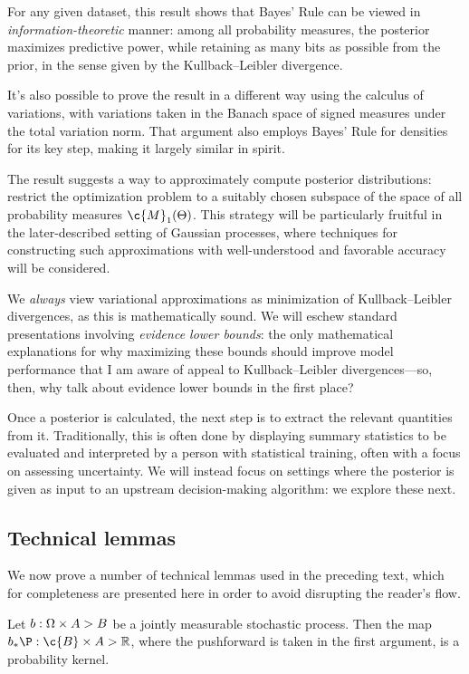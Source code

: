 \documentclass[11pt]{book}
\begin{document}
For any given dataset, this result shows that  Bayes' Rule can be viewed in \emph{information-theoretic} manner: among all probability measures, the posterior maximizes predictive power, while retaining as many bits as possible from the prior, in the sense given by the Kullback--Leibler divergence.

It's also possible to prove the result in a different way using the calculus of variations, with variations taken in the Banach space of signed measures under the total variation norm.
That argument also employs Bayes' Rule for densities for its key step, making it largely similar in spirit.

The result suggests a way to approximately compute posterior distributions: restrict the optimization problem to a suitably chosen subspace of the space of all probability measures $\c{M}_1(\Theta)$.
This strategy will be particularly fruitful in the later-described setting of Gaussian processes, where techniques for constructing such approximations with well-understood and favorable accuracy will be considered.

We \emph{always} view variational approximations as minimization of Kullback--Leibler divergences, as this is mathematically sound.
We will eschew standard presentations involving \emph{evidence lower bounds}: the only mathematical explanations for why maximizing these bounds should improve model performance that I am aware of appeal to Kullback--Leibler divergences---so, then, why talk about evidence lower bounds in the first place?

Once a posterior is calculated, the next step is to extract the relevant quantities from it.
Traditionally, this is often done by displaying summary statistics to be evaluated and interpreted by a person with statistical training, often with a focus on assessing uncertainty.
We will instead focus on settings where the posterior is given as input to an upstream decision-making algorithm: we explore these next.

\subsection{Technical lemmas}

We now prove a number of technical lemmas used in the preceding text, which for completeness are presented here in order to avoid disrupting the reader's flow.

\begin{lemma}
\label{lem:rcrv-rvm-equiv}
Let $b:\Omega\times A\->B$ be a jointly measurable stochastic process.
Then the map $b_*\P : \c{B} \x A \-> \R$, where the pushforward is taken in the first argument, is a probability kernel.
\end{lemma}
\end{document}
